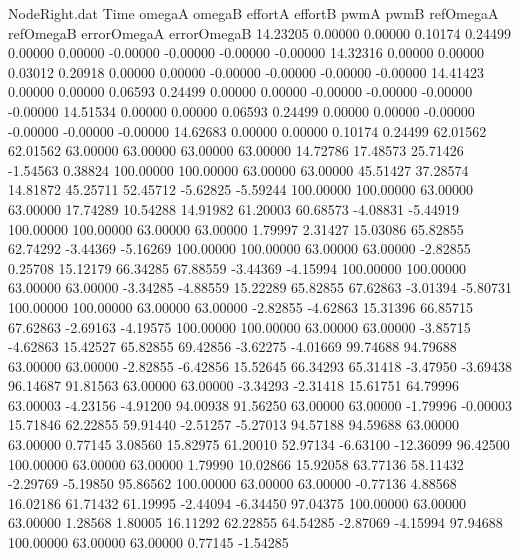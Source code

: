 \begin{filecontents}{NodeRight.dat}
Time omegaA omegaB effortA effortB pwmA pwmB refOmegaA refOmegaB errorOmegaA errorOmegaB
  14.23205    0.00000    0.00000     0.10174    0.24499    0.00000    0.00000   -0.00000   -0.00000   -0.00000   -0.00000
  14.32316    0.00000    0.00000     0.03012    0.20918    0.00000    0.00000   -0.00000   -0.00000   -0.00000   -0.00000
  14.41423    0.00000    0.00000     0.06593    0.24499    0.00000    0.00000   -0.00000   -0.00000   -0.00000   -0.00000
  14.51534    0.00000    0.00000     0.06593    0.24499    0.00000    0.00000   -0.00000   -0.00000   -0.00000   -0.00000
  14.62683    0.00000    0.00000     0.10174    0.24499   62.01562   62.01562   63.00000   63.00000   63.00000   63.00000
  14.72786   17.48573   25.71426    -1.54563    0.38824  100.00000  100.00000   63.00000   63.00000   45.51427   37.28574
  14.81872   45.25711   52.45712    -5.62825   -5.59244  100.00000  100.00000   63.00000   63.00000   17.74289   10.54288
  14.91982   61.20003   60.68573    -4.08831   -5.44919  100.00000  100.00000   63.00000   63.00000    1.79997    2.31427
  15.03086   65.82855   62.74292    -3.44369   -5.16269  100.00000  100.00000   63.00000   63.00000   -2.82855    0.25708
  15.12179   66.34285   67.88559    -3.44369   -4.15994  100.00000  100.00000   63.00000   63.00000   -3.34285   -4.88559
  15.22289   65.82855   67.62863    -3.01394   -5.80731  100.00000  100.00000   63.00000   63.00000   -2.82855   -4.62863
  15.31396   66.85715   67.62863    -2.69163   -4.19575  100.00000  100.00000   63.00000   63.00000   -3.85715   -4.62863
  15.42527   65.82855   69.42856    -3.62275   -4.01669   99.74688   94.79688   63.00000   63.00000   -2.82855   -6.42856
  15.52645   66.34293   65.31418    -3.47950   -3.69438   96.14687   91.81563   63.00000   63.00000   -3.34293   -2.31418
  15.61751   64.79996   63.00003    -4.23156   -4.91200   94.00938   91.56250   63.00000   63.00000   -1.79996   -0.00003
  15.71846   62.22855   59.91440    -2.51257   -5.27013   94.57188   94.59688   63.00000   63.00000    0.77145    3.08560
  15.82975   61.20010   52.97134    -6.63100  -12.36099   96.42500  100.00000   63.00000   63.00000    1.79990   10.02866
  15.92058   63.77136   58.11432    -2.29769   -5.19850   95.86562  100.00000   63.00000   63.00000   -0.77136    4.88568
  16.02186   61.71432   61.19995    -2.44094   -6.34450   97.04375  100.00000   63.00000   63.00000    1.28568    1.80005
  16.11292   62.22855   64.54285    -2.87069   -4.15994   97.94688  100.00000   63.00000   63.00000    0.77145   -1.54285

\end{filecontents}
